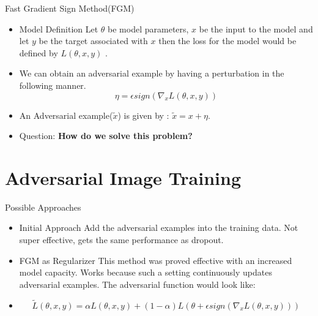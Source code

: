 \documentclass[10pt]{beamer}
\begin{document}
\begin{frame}{Fast Gradient Sign Method(FGM)}
\begin{itemize}
	
	\item[] { \begin{block}{Model Definition}
		Let $\theta$ be model parameters, $x$ be the input to the model and let $y$ be the target associated with $x$ then the loss for the model would be defined by $L(\theta,x,y)$ .
	\end{block} }
	\pause
	\item[] {We can obtain an adversarial example by having a perturbation in the following manner.  \\
				\begin{equation}
					\eta = \epsilon sign(\nabla_{x} L(\theta, x,y)) 
				\end{equation} 
			
		}
	\pause
	\item[] An Adversarial example($\tilde{x}$) is given by : $\tilde{x} = x + \eta$.  
	\pause
		
	\item[] {
		\begin{alertblock}{Question:}
			\textbf{\alert{How do we solve this problem?}}
		\end{alertblock}
		
	}

\end{itemize}

\end{frame}

\section{Adversarial Image Training}
\begin{frame}{Possible Approaches}
	\begin{itemize}
		\item[] {
			\begin{block}{Initial Approach}
				Add the adversarial examples  into the training data. Not super effective, gets the same performance as dropout.
			\end{block}
		}
		\pause
		\item[] {
			\begin{block}{FGM as Regularizer}
				This method was proved effective with an increased model capacity. Works because such a setting continuously updates adversarial examples.
				The adversarial function would look like: 
			\end{block}
		}
	\pause
		\item[] {
			\begin{equation}
				\tilde{L}(\theta,x,y) = \alpha L(\theta,x,y) + (1-\alpha)L(\theta + \epsilon sign(\nabla_{x} L(\theta, x,y)))
			\end{equation}
		}
	\end{itemize}
	
\end{frame}
\end{document}
